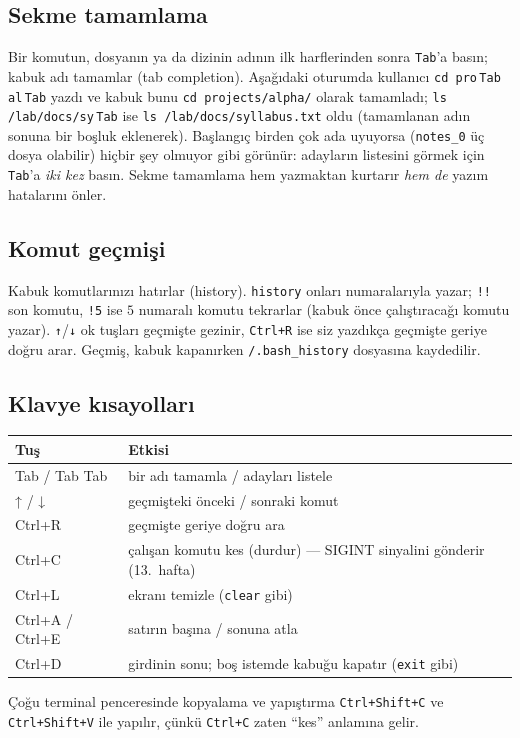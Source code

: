 \documentclass[11pt,a4paper]{article}
\newcommand{\cmd}[1]{\texttt{#1}}
\begin{document}
\subsection{Sekme tamamlama}
Bir komutun, dosyanın ya da dizinin adının ilk harflerinden sonra \texttt{Tab}'a basın; kabuk adı tamamlar (tab completion). Aşağıdaki oturumda kullanıcı \texttt{cd pro}\,\texttt{Tab}\,\texttt{al}\,\texttt{Tab} yazdı ve kabuk bunu \texttt{cd projects/alpha/} olarak tamamladı; \texttt{ls \tl/lab/docs/sy}\,\texttt{Tab} ise \texttt{ls \tl/lab/docs/syllabus.txt} oldu (tamamlanan adın sonuna bir boşluk eklenerek). Başlangıç birden çok ada uyuyorsa (\texttt{notes\_0} üç dosya olabilir) hiçbir şey olmuyor gibi görünür: adayların listesini görmek için \texttt{Tab}'a \emph{iki kez} basın. Sekme tamamlama hem yazmaktan kurtarır \emph{hem de} yazım hatalarını önler.

\subsection{Komut geçmişi}


Kabuk komutlarınızı hatırlar (history). \cmd{history} onları numaralarıyla yazar; \cmd{!!} son komutu, \cmd{!5} ise $5$ numaralı komutu tekrarlar (kabuk önce çalıştıracağı komutu yazar). \texttt{↑}/\texttt{↓} ok tuşları geçmişte gezinir, \texttt{Ctrl+R} ise siz yazdıkça geçmişte geriye doğru arar. Geçmiş, kabuk kapanırken \texttt{\tl/.bash\_history} dosyasına kaydedilir.

\subsection{Klavye kısayolları}

\begin{center}
\begin{tabular}{>{\ttfamily}l l}
\toprule
\normalfont\textbf{Tuş} & \textbf{Etkisi}\\
\midrule
Tab / Tab Tab & bir adı tamamla / adayları listele\\
↑ / ↓ & geçmişteki önceki / sonraki komut\\
Ctrl+R & geçmişte geriye doğru ara\\
Ctrl+C & çalışan komutu kes (durdur) --- SIGINT sinyalini gönderir (13.\ hafta)\\
Ctrl+L & ekranı temizle (\cmd{clear} gibi)\\
Ctrl+A / Ctrl+E & satırın başına / sonuna atla\\
Ctrl+D & girdinin sonu; boş istemde kabuğu kapatır (\cmd{exit} gibi)\\
\bottomrule
\end{tabular}
\end{center}
Çoğu terminal penceresinde kopyalama ve yapıştırma \texttt{Ctrl+Shift+C} ve \texttt{Ctrl+Shift+V} ile yapılır, çünkü \texttt{Ctrl+C} zaten ``kes'' anlamına gelir.
\end{document}

